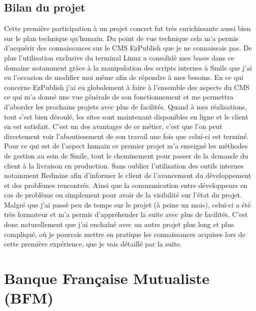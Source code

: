 \documentclass[a4paper,11pt,twoside]{report}
\begin{document}
    \subsection*{Bilan du projet}
    Cette première participation à un projet concret fut très enrichissante aussi bien sur le plan technique qu'humain. Du point de vue technique cela m'a permis d'acquérir des connaissances sur le CMS EzPublish que je ne connaissais pas. De plus l'utilisation exclusive du terminal Linux a consolidé mes bases dans ce domaine notamment grâce à la manipulation des scripts internes à Smile que j'ai eu l'occasion de modifier moi même afin de répondre à mes besoins. En ce qui concerne EzPublish j'ai eu globalement à faire à l'ensemble des aspects du CMS ce qui m'a donné une vue générale de son fonctionnement et me permettra d'aborder les prochains projets avec plus de facilités. Quand à mes réalisations, tout s'est bien déroulé, les sites sont maintenant disponibles en ligne et le client en est satisfait. C'est un des avantages de ce métier, c'est que l'on peut directement voir l'aboutissement de son travail une fois que celui-ci est terminé. Pour ce qui est de l'aspect humain ce premier projet m'a enseigné les méthodes de gestion au sein de Smile, tout le cheminement pour passer de la demande du client à la livraison en production. Sans oublier l'utilisation des outils internes notamment Redmine afin d'informer le client de l'avancement du développement et des problèmes rencontrés. Ainsi que la communication entre développeurs en cas de problème ou simplement pour avoir de la visibilité sur l'état du projet. Malgré que j'ai passé peu de temps sur le projet (à peine un mois), celui-ci a été très formateur et m'a permis d'appréhender la suite avec plus de facilités. C'est donc naturellement que j'ai enchaîné avec un autre projet plus long et plus compliqué, où je pourrais mettre en pratique les connaissances acquises lors de cette première expérience, que je vais détaillé par la suite.  
    
\newpage
    
  \section{Banque Française Mutualiste (BFM)}
\end{document}
